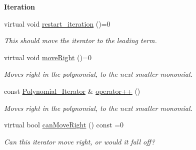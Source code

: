 \begin{Indent}\textbf{ Iteration}\par
\begin{DoxyCompactItemize}
\item 
\mbox{\label{class_polynomial___iterator_a7135fd6c3a90134741abc2da51467a43}} 
virtual void \hyperlink{class_polynomial___iterator_a7135fd6c3a90134741abc2da51467a43}{restart\+\_\+iteration} ()=0
\begin{DoxyCompactList}\small\item\em This should move the iterator to the leading term. \end{DoxyCompactList}\item 
\mbox{\label{class_polynomial___iterator_ad7adb26df3077c6c7dec39e066436ce9}} 
virtual void \hyperlink{class_polynomial___iterator_ad7adb26df3077c6c7dec39e066436ce9}{move\+Right} ()=0
\begin{DoxyCompactList}\small\item\em Moves right in the polynomial, to the next smaller monomial. \end{DoxyCompactList}\item 
\mbox{\label{class_polynomial___iterator_a934c291b780f91efefea23880827d5dc}} 
const \hyperlink{class_polynomial___iterator}{Polynomial\+\_\+\+Iterator} \& \hyperlink{class_polynomial___iterator_a934c291b780f91efefea23880827d5dc}{operator++} ()
\begin{DoxyCompactList}\small\item\em Moves right in the polynomial, to the next smaller monomial. \end{DoxyCompactList}\item 
\mbox{\label{class_polynomial___iterator_ae800f42d78fae005b9d9600b00946026}} 
virtual bool \hyperlink{class_polynomial___iterator_ae800f42d78fae005b9d9600b00946026}{can\+Move\+Right} () const =0
\begin{DoxyCompactList}\small\item\em Can this iterator move right, or would it fall off? \end{DoxyCompactList}\item 
\mbox{\label{class_polynomial___iterator_a47683fc8085c51bd14c5647a7e9e7e87}} 

\end{DoxyCompactItemize}
\end{Indent}
